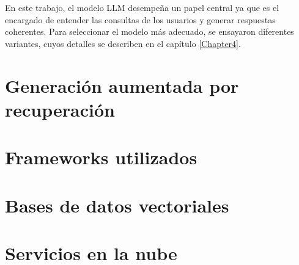 En este trabajo, el modelo LLM desempeña un papel central ya que es el encargado de entender las consultas de 
los usuarios y generar respuestas coherentes. Para seleccionar el modelo más adecuado, 
se ensayaron diferentes variantes, cuyos detalles se describen en el capítulo \ref{Chapter4}.

\section{Generación aumentada por recuperación}

\section{Frameworks utilizados}

\section{Bases de datos vectoriales}

\section{Servicios en la nube}
